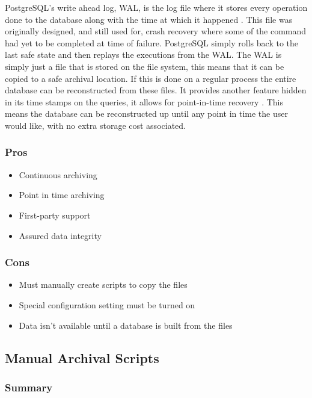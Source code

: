 \documentclass[draftclsnofoot,onecolumn,journal,letterpaper,compsoc,10pt]{IEEEtran}
\begin{document}
        PostgreSQL's write ahead log, WAL, is the log file where it stores every operation done to the database along with the time at which it happened \cite{postgresql_wal}.  This file was originally designed, and still used for, crash recovery where some of the command had yet to be completed at time of failure.  PostgreSQL simply rolls back to the last safe state and then replays the executions from the WAL.  The WAL is simply just a file that is stored on the file system, this means that it can be copied to a safe archival location.  If this is done on a regular process the entire database can be reconstructed from these files.  It provides another feature hidden in its time stamps on the queries, it allows for point-in-time recovery \cite{postgresql_wal}.  This means the database can be reconstructed up until any point in time the user would like, with no extra storage cost associated.
        
        \subsubsection{Pros}
        \begin{itemize}
            \item Continuous archiving
            \item Point in time archiving
            \item First-party support
            \item Assured data integrity
        \end{itemize}
        
        \subsubsection{Cons}
        \begin{itemize}
            \item Must manually create scripts to copy the files
            \item Special configuration setting must be turned on
            \item Data isn't available until a database is built from the files
        \end{itemize}
    
    \subsection{Manual Archival Scripts}
    
        \subsubsection{Summary}
        
\end{document}
